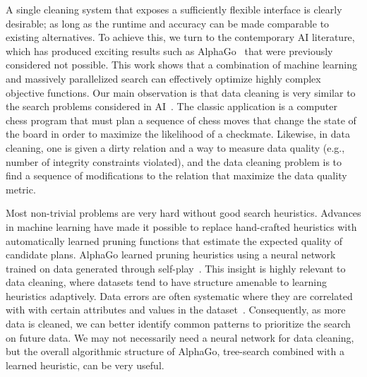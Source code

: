 A single cleaning system that exposes a sufficiently flexible interface is clearly desirable; as long as the runtime and accuracy can be made comparable to existing alternatives.  
To achieve this, we turn to the contemporary AI literature, which has produced exciting results such as AlphaGo~\cite{silver2016mastering} that were previously considered not possible.    This work shows that a combination of machine learning and massively parallelized search can effectively optimize highly complex objective functions.
Our main observation is that data cleaning is very similar to the search problems considered in AI~\cite{russell1995modern}.
The classic application is a computer chess program that must plan a sequence of chess moves that change the state of the board in order to maximize the likelihood of a checkmate. Likewise, in data cleaning, one is given a dirty relation and a way to measure data quality (e.g., number of integrity constraints violated), and the data cleaning problem is to find a sequence of modifications to the relation that maximize the data quality metric.

Most non-trivial problems are very hard without good search heuristics.
Advances in machine learning have made it possible to replace hand-crafted heuristics with automatically learned pruning functions that estimate the expected quality of candidate plans. AlphaGo learned pruning heuristics using a neural network trained on data generated through self-play~\cite{silver2016mastering}.
This insight is highly relevant to data cleaning, where datasets tend to have structure amenable to learning heuristics adaptively.
Data errors are often systematic where they are correlated with with certain attributes and values in the dataset~\cite{rekatsinas2017holoclean,DBLP:journals/pvldb/KrishnanWWFG16}.
Consequently, as more data is cleaned, we can better identify common patterns to prioritize the search on future data.
We may not necessarily need a neural network for data cleaning, but the overall algorithmic structure of AlphaGo, tree-search combined with a learned heuristic, can be very useful.

